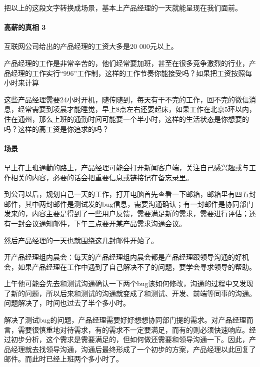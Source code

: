\documentclass[letterpaper,11pt,english]{sphinxmanual}
\begin{document}
把以上的这段文字转换成场景，基本上产品经理的一天就能呈现在我们面前。


\paragraph{高薪的真相 3\sphinxfootnotemark[615]}
\label{\detokenize{chapter_experience/1Day:id2}}%
\begin{footnotetext}[615]\sphinxAtStartFootnote
{}
%
\end{footnotetext}\ignorespaces 
互联网公司给出的产品经理的工资大多是20 000元以上。

产品经理的工作是非常辛苦的，他们经常要加班，甚至在很多竞争激烈的行业，产品经理的工作实行“996”工作制，这样的工作节奏你能接受吗？如果把工资按照每小时来计算

这些产品经理需要24小时开机，随传随到，每天有干不完的工作，回不完的微信消息，经常需要到凌晨才能睡觉，早上8点左右还要起床，如果工作在北京5环以内，住在通州，那么上班的通勤时间可能要一个半小时，这样的生活状态是你想要的吗？这样的高工资是你追求的吗？


\paragraph{场景}
\label{\detokenize{chapter_experience/1Day:id3}}
早上在上班通勤的路上，产品经理可能会打开新闻客户端，关注自己感兴趣或与工作相关的内容，必要的话会把重要信息或链接记在备忘录里。

到公司以后，规划自己一天的工作，打开电脑首先查看一下邮箱，邮箱里有四五封邮件，其中两封邮件是测试发的bug信息，需要沟通确认；有一封邮件是协同部门发来的，内容主要是得到了一些用户反馈，需要满足新的需求，需要进行评估；还有一封会议通知邮件，下午三点要开某产品需求沟通会议。

然后产品经理的一天也就围绕这几封邮件开始了。

开产品经理组内晨会：每天的产品经理组内晨会都是产品经理跟领导沟通的好机会，如果产品经理在工作中遇到了自己解决不了的问题，要学会寻求领导的帮助。

上午他可能会先去和测试沟通确认一下两个bug该如何修改，沟通的过程中又发现了新的问题，所以后来和测试的沟通就变成了和测试、开发、前端等同事的沟通。问题解决了，时间也过去了半个多小时。

解决了测试bug的问题，产品经理需要好好想想协同部门提的需求。对产品经理而言，需要很慎重地对待需求，有的需求不一定要满足，而有的则必须快速响应。经过初步分析，这个需求是需要满足的，但如何做还需要和领导沟通一下。因此，产品经理就去找领导沟通，沟通后最终形成了一个初步的方案，产品经理以此回复了邮件。而此时已经上班两个多小时了。
\end{document}
